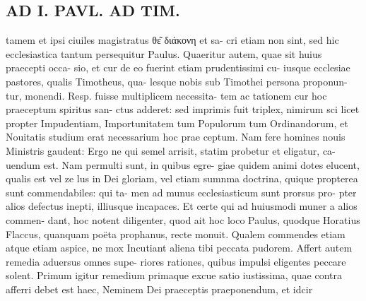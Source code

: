 \documentclass{article}
\begin{document}
\begin{pages}
\section*{AD I. PAVL. AD TIM. }
\marginpar{[ p.338 ]}\pstart tamem et ipsi ciuiles magistratus θε͂ διάκονη et sa- cri etiam non sint, sed hic ecclesiastica tantum persequitur Paulus. Quaeritur autem, quae sit huius praecepti occa- sio, et cur de eo fuerint etiam prudentissimi cu- iusque ecclesiae pastores, qualis Timotheus, qua- lesque nobis sub Timothei persona proponun- tur, monendi. Resp. fuisse multiplicem necessita- tem ac tationem cur hoc praeceptum spiritus san- ctus adderet: sed imprimis fuit triplex, nimirum sci licet propter Impudentiam, Importunitatem tum Populorum tum Ordinandorum, et Nouitatis studium erat necessarium hoc prae ceptum. Nam fere homines nouis Ministris gaudent: Ergo ne qui semel arrisit, statim probetur et eligatur, ca- uendum est. Nam permulti sunt, in quibus egre- giae quidem animi dotes elucent, qualis est vel ze lus in Dei gloriam, vel etiam sumnma doctrina, quique propterea sunt commendabiles: qui ta- men ad munus ecclesiasticum sunt prorsus pro- pter alios defectus inepti, illiusque incapaces. Et certe qui ad huiusmodi muner a alios commen- dant, hoc notent diligenter, quod ait hoc loco Paulus, quodque Horatius Flaccus, quanquam poëta prophanus, recte monuit. Qualem commendes etiam atque etiam aspice, ne mox Incutiant aliena tibi peccata pudorem. Affert autem remedia aduersus omnes supe- riores rationes, quibus impulsi eligentes peccare solent. Primum igitur remedium primaque excue satio iustissima, quae contra afferri debet est haec, Neminem Dei praeceptis praeponendum, et idcir  \pend

\end{pages}
\end{document}
